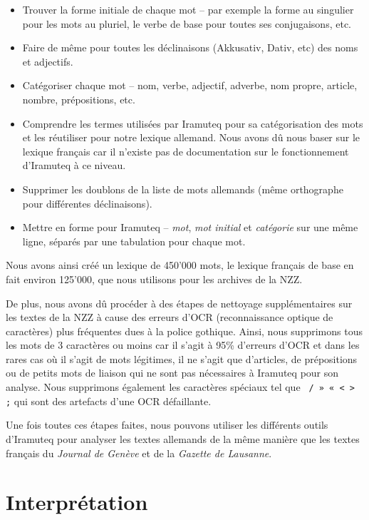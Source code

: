 \documentclass[french,a4paper]{article}
\begin{document}
\begin{itemize}
    \item Trouver la forme initiale de chaque mot -- par exemple la forme au singulier pour les mots au pluriel, le verbe de base pour toutes ses conjugaisons, etc.
    \item Faire de même pour toutes les déclinaisons (Akkusativ, Dativ, etc) des noms et adjectifs.
    \item Catégoriser chaque mot -- nom, verbe, adjectif, adverbe, nom propre, article, nombre, prépositions, etc.
    \item Comprendre les termes utilisées par Iramuteq pour sa catégorisation des mots et les réutiliser pour notre lexique allemand.
    Nous avons dû nous baser sur le lexique français car il n'existe pas de documentation sur le fonctionnement d'Iramuteq à ce niveau.
    \item Supprimer les doublons de la liste de mots allemands (même orthographe pour différentes déclinaisons).
    \item Mettre en forme pour Iramuteq -- \textit{mot}, \textit{mot initial} et \textit{catégorie} sur une même ligne, séparés par une tabulation pour chaque mot.
\end{itemize}

Nous avons ainsi créé un lexique de 450'000 mots, le lexique français de base en fait environ 125'000, que nous utilisons pour les archives de la NZZ.

De plus, nous avons dû procéder à des étapes de nettoyage supplémentaires sur les textes de la NZZ à cause des erreurs d'OCR (reconnaissance optique de caractères) plus fréquentes dues à la police gothique.
Ainsi, nous supprimons tous les \og mots \fg{} de 3 caractères ou moins car il s'agit à 95\% d'erreurs d'OCR et dans les rares cas où il s'agit de mots légitimes, il ne s'agit que d'articles, de prépositions ou de petits mots de liaison qui ne sont pas nécessaires à Iramuteq pour son analyse.
Nous supprimons également les caractères spéciaux tel que \og \texttt{\ / » «  < > ;} \fg{} qui sont des artefacts d'une OCR défaillante.

Une fois toutes ces étapes faites, nous pouvons utiliser les différents outils d'Iramuteq pour analyser les textes allemands de la même manière que les textes français du \textit{Journal de Genève} et de la \textit{Gazette de Lausanne}.

\section*{Interprétation}
\end{document}
